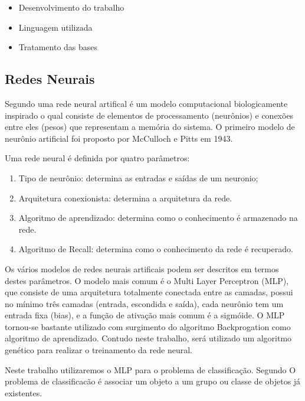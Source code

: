 \documentclass[12pt]{article}
\begin{document}
\begin{itemize}
\item Desenvolvimento do trabalho
\item Linguagem utilizada
\item Tratamento das bases
\end{itemize}

\subsection{Redes Neurais}

\par Segundo \cite{kasabov} uma rede neural artifical é um modelo computacional biologicamente inspirado o qual consiste de elementos de processamento (neurônios) e conexões entre eles (pesos) que representam a memória do sistema. O primeiro modelo de neurônio artificial foi proposto por McCulloch e Pitts em 1943. 
\par Uma rede neural é definida por quatro parâmetros:

\begin{enumerate}
	\item Tipo de neurônio: determina as entradas e saídas de um neuronio;
	\item Arquitetura conexionista: determina a arquitetura da rede.
	\item Algoritmo de aprendizado: determina como o conhecimento é armazenado na rede.
	\item Algoritmo de Recall: determina como o conhecimento da rede é recuperado.
\end{enumerate}

\par Os vários modelos de redes neurais artificais podem ser descritos em termos destes parâmetros. O modelo mais comum é o Multi Layer Perceptron (MLP), que consiste de uma arquitetura totalmente conectada entre as camadas, possui no mínimo três camadas (entrada, escondida e saída), cada neurônio tem um entrada fixa (bias), e a função de ativação mais comum é a sigmóide. O MLP tornou-se bastante utilizado com surgimento do algoritmo Backprogation como algoritmo de aprendizado. Contudo neste trabalho, será utilizado um algoritmo genético para realizar o treinamento da rede neural.

\par Neste trabalho utilizaremos o MLP para o problema de classificação. Segundo \cite{kasabov} O problema de classificacão é associar um objeto a um grupo ou classe de objetos já existentes. 
\end{document}
